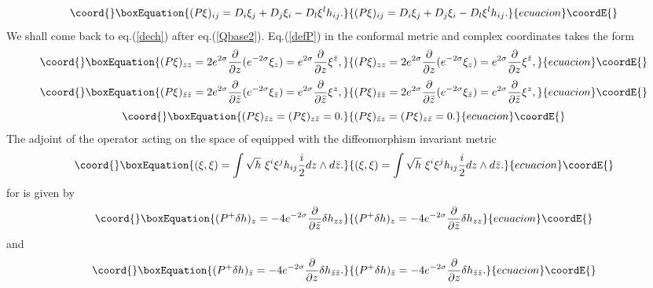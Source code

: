 \documentclass[a4paper,12pt]{article}
\begin{document}
\begin{equation}\coord{}\boxEquation{\label{defP}
(P\xi)_{ij} = D_i\xi_j+D_j\xi_i -D_l\xi^l h_{ij}.
}{(P\xi)_{ij} = D_i\xi_j+D_j\xi_i -D_l\xi^l h_{ij}.
}{ecuacion}\coordE{}\end{equation}
We shall come back to eq.(\ref{dech}) after eq.(\ref{Qbase2}).
Eq.(\ref{defP}) in the conformal metric and complex coordinates takes the
form \cite{alvarez}
\begin{equation}\coord{}\boxEquation{\label{defPcz}
(P\xi)_{zz} = 2
e^{2\sigma}\frac{\partial}{\partial 
z} (e^{-2\sigma}\xi_{z}) = e^{2\sigma}\frac{\partial}{\partial
z}\xi^{\bar z},
}{(P\xi)_{zz} = 2
e^{2\sigma}\frac{\partial}{\partial 
z} (e^{-2\sigma}\xi_{z}) = e^{2\sigma}\frac{\partial}{\partial
z}\xi^{\bar z},
}{ecuacion}\coordE{}\end{equation}
\begin{equation}\coord{}\boxEquation{\label{defPcbz}
(P\xi)_{\bar z\bar z} = 2
e^{2\sigma}\frac{\partial}{\partial 
\bar z} (e^{-2\sigma}\xi_{\bar z}) = e^{2\sigma}\frac{\partial}{\partial
\bar z}\xi^{z},
}{(P\xi)_{\bar z\bar z} = 2
e^{2\sigma}\frac{\partial}{\partial 
\bar z} (e^{-2\sigma}\xi_{\bar z}) = e^{2\sigma}\frac{\partial}{\partial
\bar z}\xi^{z},
}{ecuacion}\coordE{}\end{equation}
\begin{equation}\coord{}\boxEquation{
(P\xi)_{\bar zz}= (P\xi)_{z\bar z}=0.
}{
(P\xi)_{\bar zz}= (P\xi)_{z\bar z}=0.
}{ecuacion}\coordE{}\end{equation} 
The adjoint \coordHE{} of the operator \coordHE{} acting on the space of \coordHE{} 
equipped with the diffeomorphism invariant metric 
\begin{equation}\coord{}\boxEquation{
(\xi, \xi)=\int \sqrt h~ \xi^i \xi^j h_{ij} \frac{i}{2} dz \wedge d\bar z.
}{
(\xi, \xi)=\int \sqrt h~ \xi^i \xi^j h_{ij} \frac{i}{2} dz \wedge d\bar z.
}{ecuacion}\coordE{}\end{equation}
for \coordHE{} is given by 
\begin{equation}\coord{}\boxEquation{
(P^+ \delta h)_z = -4 e^{-2\sigma}\frac{\partial}{\partial \bar z}
\delta h_{zz}
}{
(P^+ \delta h)_z = -4 e^{-2\sigma}\frac{\partial}{\partial \bar z}
\delta h_{zz}
}{ecuacion}\coordE{}\end{equation}
and
\begin{equation}\coord{}\boxEquation{
(P^+ \delta h)_{\bar z} = 
-4e^{-2\sigma}\frac{\partial}{\partial z} \delta h_{\bar z\bar z}.
}{
(P^+ \delta h)_{\bar z} = 
-4e^{-2\sigma}\frac{\partial}{\partial z} \delta h_{\bar z\bar z}.
}{ecuacion}\coordE{}\end{equation}
\end{document}
